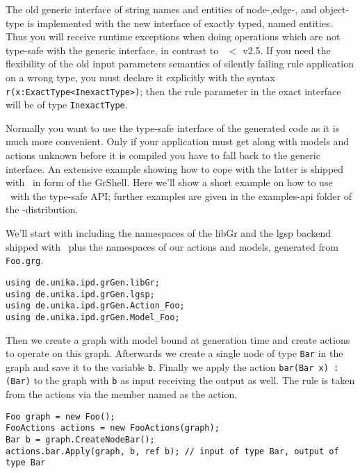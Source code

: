 \begin{note}
The old generic interface of string names and entities of node-,edge-, and object-type is implemented with the new interface of exactly typed, named entities.
Thus you will receive runtime exceptions when doing operations which are not type-safe with the generic interface, in contrast to \GrG\ $<$ v2.5.
If you need the flexibility of the old input parameters semantics of silently failing rule application on a wrong type,
you must declare it explicitly with the syntax \verb#r(x:ExactType<InexactType>)#;
then the rule parameter in the exact interface will be of type \texttt{InexactType}.
\end{note}

\begin{example}
Normally you want to use the type-safe interface of the generated code as it is much more convenient.
Only if your application must get along with models and actions unknown before it is compiled you have to fall back to the generic interface.
An extensive example showing how to cope with the latter is shipped with \GrG\ in form of the GrShell.
Here we'll show a short example on how to use \GrG\ with the type-safe API; 
further examples are given in the examples-api folder of the \GrG-distribution.

We'll start with including the namespaces of the libGr and the lgsp backend shipped with \GrG\,
plus the namespaces of our actions and models, generated from \texttt{Foo.grg}.
\begin{verbatim}
using de.unika.ipd.grGen.libGr;
using de.unika.ipd.grGen.lgsp;
using de.unika.ipd.grGen.Action_Foo;
using de.unika.ipd.grGen.Model_Foo;
\end{verbatim}

Then we create a graph with model bound at generation time and create actions to operate on this graph.
Afterwards we create a single node of type \texttt{Bar} in the graph and save it to the variable \texttt{b}.
Finally we apply the action \texttt{bar(Bar x) : (Bar)} to the graph with \texttt{b} as input receiving the output as well.
The rule is taken from the actions via the member named as the action.
\begin{verbatim}
Foo graph = new Foo();
FooActions actions = new FooActions(graph);
Bar b = graph.CreateNodeBar();
actions.bar.Apply(graph, b, ref b); // input of type Bar, output of type Bar
\end{verbatim}


\end{example}
